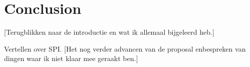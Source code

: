 \chapter*{Conclusion}

[Terugblikken naar de introductie en wat ik allemaal bijgeleerd heb.]

Vertellen over SPI.
[Het nog verder advancen van de proposal enbespreken van dingen waar ik niet klaar mee geraakt ben.]
